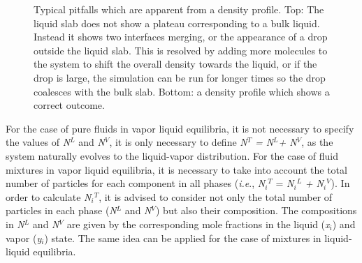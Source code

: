 \documentclass[9pt,bestpractices]{livecoms}
\begin{document}
\begin{figure}
\begin{subfigure}{0.3\textwidth}
	\end{subfigure}
  \caption{Typical pitfalls which are apparent from a density profile. 
    Top: The liquid slab does not show
a plateau corresponding to a bulk liquid. Instead it shows two interfaces
merging, or the appearance of a drop outside the liquid slab. 
This is resolved by adding more molecules to the system to shift the
overall density towards the liquid, or if the drop is large, the simulation can be run for longer times so
the drop coalesces with the bulk slab. Bottom: a density profile which
shows a correct outcome.
}
\label{fig:7b}
\end{figure}

For the case of pure fluids in vapor \textendash{} liquid equilibria, it is not
necessary to specify the values of \textit{N}$^{L}$ and \textit{N}$^{V}$, it is
only necessary to define \textit{N}$^{T}$ \textit{= N}$^{L}$\textit{+ N}$^{V}$,
as the system naturally evolves to the liquid-vapor distribution. For the case
of fluid mixtures in vapor \textendash{} liquid equilibria, it is necessary to
take into account the total number of particles for each component in all
phases (\textit{i.e}., \textit{N}$_{i}$$^{T}$ = \textit{N}$_{i}$$^{L}$
\textit{+ N}$_{i}$$^{V}$). In order to calculate \textit{N}$_{i}$$^{T}$, it is
advised to consider not only the total number of particles in each phase
(\textit{N}$^{L}$ and \textit{N}$^{V}$) but also their composition. The
compositions in \textit{N}$^{L}$ and \textit{N}$^{V}$ are given by the
corresponding mole fractions in the liquid (\textit{x}$_{i}$) and vapor
(\textit{y}$_{i}$) state. The same idea can be applied for the case of mixtures
in liquid-liquid equilibria.
\end{document}
